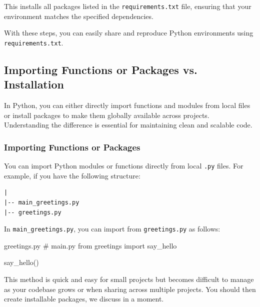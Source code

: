 This installs all packages listed in the \texttt{requirements.txt} file, ensuring that your environment matches the specified dependencies.

With these steps, you can easily share and reproduce Python environments using \texttt{requirements.txt}.

%
\subsection{Importing Functions or Packages vs. Installation}

In Python, you can either directly import functions and modules from local files or install packages to make them globally available across projects. Understanding the difference is essential for maintaining clean and scalable code.

%
\subsubsection{Importing Functions or Packages}


You can import Python modules or functions directly from local \texttt{.py} files. For example, if you have the following structure:

\begin{lstlisting}[basicstyle=\ttfamily\small]
|
|-- main_greetings.py
|-- greetings.py
\end{lstlisting}

In \texttt{main\_greetings.py}, you can import from \texttt{greetings.py} as follows:

\begin{codeonly}{greetings.py}
# main.py
from greetings import say_hello

say_hello()
\end{codeonly}

This method is quick and easy for small projects but becomes difficult to manage as your codebase grows or when sharing across multiple projects. You should then create installable packages, we discuss in a moment. 

%
